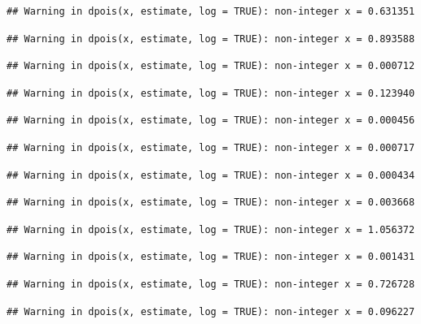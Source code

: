 \documentclass[]{article}
\begin{document}
\begin{verbatim}
## Warning in dpois(x, estimate, log = TRUE): non-integer x = 0.631351
\end{verbatim}

\begin{verbatim}
## Warning in dpois(x, estimate, log = TRUE): non-integer x = 0.893588
\end{verbatim}

\begin{verbatim}
## Warning in dpois(x, estimate, log = TRUE): non-integer x = 0.000712
\end{verbatim}

\begin{verbatim}
## Warning in dpois(x, estimate, log = TRUE): non-integer x = 0.123940
\end{verbatim}

\begin{verbatim}
## Warning in dpois(x, estimate, log = TRUE): non-integer x = 0.000456
\end{verbatim}

\begin{verbatim}
## Warning in dpois(x, estimate, log = TRUE): non-integer x = 0.000717
\end{verbatim}

\begin{verbatim}
## Warning in dpois(x, estimate, log = TRUE): non-integer x = 0.000434
\end{verbatim}

\begin{verbatim}
## Warning in dpois(x, estimate, log = TRUE): non-integer x = 0.003668
\end{verbatim}

\begin{verbatim}
## Warning in dpois(x, estimate, log = TRUE): non-integer x = 1.056372
\end{verbatim}

\begin{verbatim}
## Warning in dpois(x, estimate, log = TRUE): non-integer x = 0.001431
\end{verbatim}

\begin{verbatim}
## Warning in dpois(x, estimate, log = TRUE): non-integer x = 0.726728
\end{verbatim}

\begin{verbatim}
## Warning in dpois(x, estimate, log = TRUE): non-integer x = 0.096227
\end{verbatim}
\end{document}
